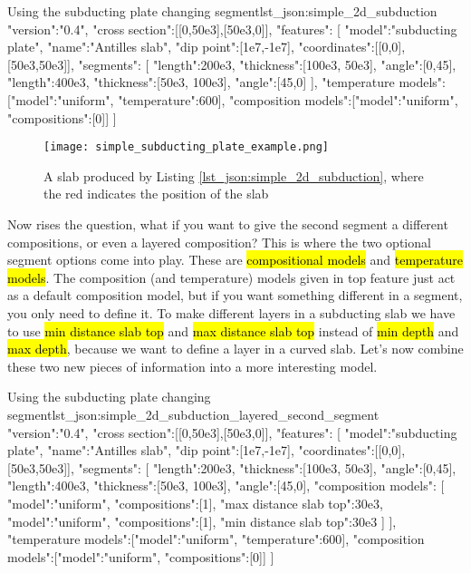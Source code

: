 \documentclass{book}
\begin{document}
\begin{javascriptcode}{Using the subducting plate changing segment}{lst_json:simple_2d_subduction}
{
  "version":"0.4",
  "cross section":[[0,50e3],[50e3,0]],
  "features":
  [
     {
       "model":"subducting plate", "name":"Antilles slab", "dip point":[1e7,-1e7],
       "coordinates":[[0,0],[50e3,50e3]], 
       "segments":
       [
         {"length":200e3, "thickness":[100e3, 50e3], "angle":[0,45]},
         {"length":400e3, "thickness":[50e3, 100e3], "angle":[45,0]}
       ],
       "temperature models":[{"model":"uniform", "temperature":600}],
       "composition models":[{"model":"uniform", "compositions":[0]}]
    }
  ]
}
\end{javascriptcode}

\begin{figure}
    \centering
    \texttt{[image: simple\_subducting\_plate\_example.png]}
    \caption{A slab produced by Listing \ref{lst_json:simple_2d_subduction}, where the red indicates the position of the slab}
    \label{fig:simple_2d_subduction_1}
\end{figure}

Now rises the question, what if you want to give the second segment a different compositions, or even a layered composition? This is where the two optional segment options come into play. These are \hl{compositional models} and \hl{temperature models}. The composition (and temperature) models given in top feature just act as a default composition model, but if you want something different in a segment, you only need to define it. To make different layers in a subducting slab we have to use \hl{min distance slab top} and \hl{max distance slab top} instead of \hl{min depth} and \hl{max depth}, because we want to define a layer in a curved slab. Let's now combine these two new pieces of information into a more interesting model.

\begin{javascriptcode}{Using the subducting plate changing segment}{lst_json:simple_2d_subduction_layered_second_segment}
{
  "version":"0.4",
  "cross section":[[0,50e3],[50e3,0]],
  "features":
  [
     {
       "model":"subducting plate", "name":"Antilles slab", "dip point":[1e7,-1e7],
       "coordinates":[[0,0],[50e3,50e3]], 
       "segments":
       [
         {"length":200e3, "thickness":[100e3, 50e3], "angle":[0,45]},
         {
           "length":400e3, "thickness":[50e3, 100e3], "angle":[45,0],
           "composition models":
           [
             {"model":"uniform", "compositions":[1], "max distance slab top":30e3},
             {"model":"uniform", "compositions":[1], "min distance slab top":30e3}
           ]
         }
       ],
       "temperature models":[{"model":"uniform", "temperature":600}],
       "composition models":[{"model":"uniform", "compositions":[0]}]
    }
  ]
}
\end{javascriptcode}
\end{document}
